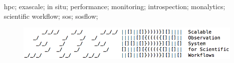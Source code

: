 \begin{IEEEkeywords}
hpc; exascale; in situ; performance; monitoring; introspection;
monalytics; scientific workflow; sos; sosflow;
\end{IEEEkeywords}


\IEEEpeerreviewmaketitle


\begin{figure}[!t]
\centering
\includegraphics[width=5in]{images/sosflow_masthead.png}
\label{fig_sim}
\end{figure}



